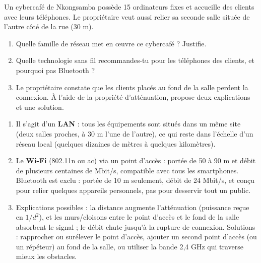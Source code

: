 \documentclass[11pt]{article}
\begin{document}
\begin{exercice}
Un cybercafé de Nkongsamba possède 15 ordinateurs fixes et accueille des clients avec leurs téléphones. Le propriétaire veut aussi relier sa seconde salle située de l'autre côté de la rue (30 m).
\begin{enumerate}
\item Quelle famille de réseau met en œuvre ce cybercafé ? Justifie.
\item Quelle technologie sans fil recommandes-tu pour les téléphones des clients, et pourquoi pas Bluetooth ?
\item Le propriétaire constate que les clients placés au fond de la salle perdent la connexion. À l'aide de la propriété d'atténuation, propose deux explications et une solution.
\end{enumerate}
\end{exercice}

\begin{corrige}
\begin{enumerate}
\item Il s'agit d'un \textbf{LAN} : tous les équipements sont situés dans un même site (deux salles proches, à 30 m l'une de l'autre), ce qui reste dans l'échelle d'un réseau local (quelques dizaines de mètres à quelques kilomètres).
\item Le \textbf{Wi-Fi} (802.11n ou ac) via un point d'accès : portée de 50 à 90 m et débit de plusieurs centaines de Mbit/s, compatible avec tous les smartphones. Bluetooth est exclu : portée de 10 m seulement, débit de 24 Mbit/s, et conçu pour relier quelques appareils personnels, pas pour desservir tout un public.
\item Explications possibles : la distance augmente l'atténuation (puissance reçue en $1/d^{2}$), et les murs/cloisons entre le point d'accès et le fond de la salle absorbent le signal ; le débit chute jusqu'à la rupture de connexion. Solutions : rapprocher ou surélever le point d'accès, ajouter un second point d'accès (ou un répéteur) au fond de la salle, ou utiliser la bande 2,4 GHz qui traverse mieux les obstacles.
\end{enumerate}
\end{corrige}
\end{document}
